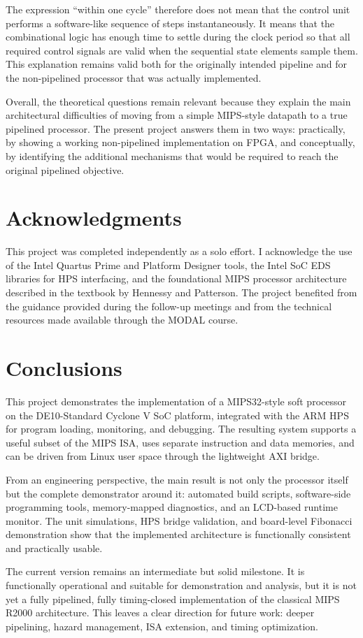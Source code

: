 \documentclass[a4paper,11pt]{scrartcl}
\begin{document}
The expression “within one cycle” therefore does not mean that the control unit performs a software-like sequence of steps instantaneously. It means that the combinational logic has enough time to settle during the clock period so that all required control signals are valid when the sequential state elements sample them. This explanation remains valid both for the originally intended pipeline and for the non-pipelined processor that was actually implemented.

Overall, the theoretical questions remain relevant because they explain the main architectural difficulties of moving from a simple MIPS-style datapath to a true pipelined processor. The present project answers them in two ways: practically, by showing a working non-pipelined implementation on FPGA, and conceptually, by identifying the additional mechanisms that would be required to reach the original pipelined objective.
\section{Acknowledgments}
\label{sec:orgce94a38}

This project was completed independently as a solo effort. I acknowledge the use of the Intel Quartus Prime and Platform Designer tools, the Intel SoC EDS libraries for HPS interfacing, and the foundational MIPS processor architecture described in the textbook by Hennessy and Patterson. The project benefited from the guidance provided during the follow-up meetings and from the technical resources made available through the MODAL course.
\section{Conclusions}
\label{sec:org74f6010}

This project demonstrates the implementation of a MIPS32-style soft processor on the DE10-Standard Cyclone V SoC platform, integrated with the ARM HPS for program loading, monitoring, and debugging. The resulting system supports a useful subset of the MIPS ISA, uses separate instruction and data memories, and can be driven from Linux user space through the lightweight AXI bridge.

From an engineering perspective, the main result is not only the processor itself but the complete demonstrator around it: automated build scripts, software-side programming tools, memory-mapped diagnostics, and an LCD-based runtime monitor. The unit simulations, HPS bridge validation, and board-level Fibonacci demonstration show that the implemented architecture is functionally consistent and practically usable.

The current version remains an intermediate but solid milestone. It is functionally operational and suitable for demonstration and analysis, but it is not yet a fully pipelined, fully timing-closed implementation of the classical MIPS R2000 architecture. This leaves a clear direction for future work: deeper pipelining, hazard management, ISA extension, and timing optimization.


\end{document}
